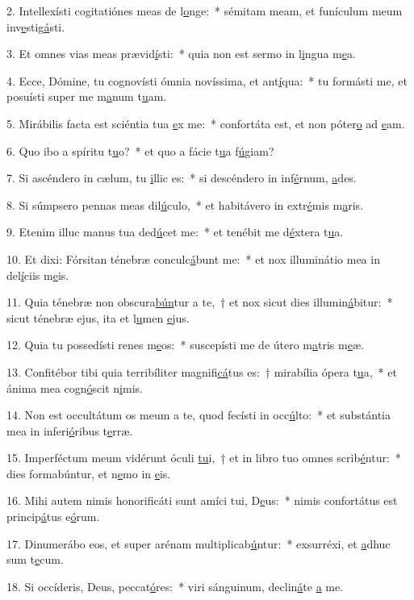 2. Intellexísti cogitatiónes meas de l\uline{o}nge:~* sémitam meam, et funículum meum inv\uline{e}stig\uline{á}sti.\par 
3. Et omnes vias meas prævid\uline{í}sti:~* quia non est sermo in l\uline{i}ngua m\uline{e}a.\par 
4. Ecce, Dómine, tu cognovísti ómnia novíssima, et ant\uline{í}qua:~* tu formásti me, et posuísti super me m\uline{a}num t\uline{u}am.\par 
5. Mirábilis facta est sciéntia tua \uline{e}x me:~* confortáta est, et non póter\uline{o} ad \uline{e}am.\par 
6. Quo ibo a spíritu t\uline{u}o?~* et quo a fácie t\uline{u}a f\uline{ú}giam?\par 
7. Si ascéndero in cælum, tu \uline{i}llic es:~* si descéndero in inf\uline{é}rnum, \uline{a}des.\par 
8. Si súmpsero pennas meas dil\uline{ú}culo,~* et habitávero in extr\uline{é}mis m\uline{a}ris.\par 
9. Etenim illuc manus tua ded\uline{ú}cet me:~* et tenébit me d\uline{é}xtera t\uline{u}a.\par 
10. Et dixi: Fórsitan ténebræ conculc\uline{á}bunt me:~* et nox illuminátio mea in del\uline{í}ciis m\uline{e}is.\par 
11. Quia ténebræ non obscura\uline{bún}tur a te,~† et nox sicut dies illumin\uline{á}bitur:~* sicut ténebræ ejus, ita et l\uline{u}men \uline{e}jus.\par 
12. Quia tu possedísti renes m\uline{e}os:~* suscepísti me de útero m\uline{a}tris m\uline{e}æ.\par 
13. Confitébor tibi quia terribíliter magnifi\uline{cá}tus es:~† mirabília ópera t\uline{u}a,~* et ánima mea cogn\uline{ó}scit n\uline{i}mis.\par 
14. Non est occultátum os meum a te, quod fecísti in occ\uline{ú}lto:~* et substántia mea in inferi\uline{ó}ribus t\uline{e}rræ.\par 
15. Imperféctum meum vidérunt óculi \uline{tu}i,~† et in libro tuo omnes scrib\uline{é}ntur:~* dies formabúntur, et n\uline{e}mo in \uline{e}is.\par 
16. Mihi autem nimis honorificáti sunt amíci tui, D\uline{e}us:~* nimis confortátus est princip\uline{á}tus e\uline{ó}rum.\par 
17. Dinumerábo eos, et super arénam multiplicab\uline{ú}ntur:~* exsurréxi, et \uline{a}dhuc sum t\uline{e}cum.\par 
18. Si occíderis, Deus, peccat\uline{ó}res:~* viri sánguinum, declin\uline{á}te \uline{a} me.\par 
